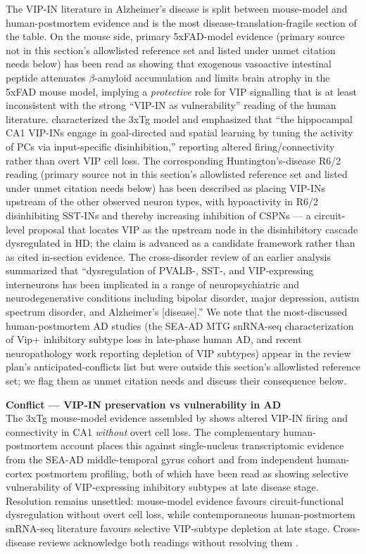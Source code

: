 \documentclass[11pt]{article}
\begin{document}
The VIP-IN literature in Alzheimer's disease is split between mouse-model
and human-postmortem evidence and is the most disease-translation-fragile
section of the table. On the mouse side, primary 5xFAD-model evidence (primary source not in this section's
allowlisted reference set and listed under unmet citation needs below) has been read as showing that exogenous vasoactive intestinal
peptide attenuates $\beta$-amyloid accumulation and limits brain atrophy in
the 5xFAD mouse model, implying a \textit{protective} role for VIP signalling
that is at least
inconsistent with the strong ``VIP-IN as vulnerability'' reading of the
human literature. \citet{Michaud2024} characterized the 3xTg model and
emphasized that ``the hippocampal CA1 VIP-INs engage in goal-directed and
spatial learning by tuning the activity of PCs via input-specific
disinhibition,'' reporting altered firing/connectivity rather than overt
VIP cell loss. The corresponding Huntington's-disease R6/2 reading
(primary source not in this section's allowlisted reference set and
listed under unmet citation needs below) has been described as placing
VIP-INs upstream of the other observed neuron types, with hypoactivity
in R6/2 disinhibiting SST-INs and thereby increasing inhibition of
CSPNs --- a circuit-level proposal that locates VIP as the upstream
node in the disinhibitory cascade dysregulated in HD; the claim is
advanced as a candidate framework rather than as cited in-section
evidence. The cross-disorder review of an earlier analysis summarized that
``dysregulation of PVALB-, SST-, and VIP-expressing interneurons has been
implicated in a range of neuropsychiatric and neurodegenerative
conditions including bipolar disorder, major depression, autism spectrum
disorder, and Alzheimer's [disease].'' We note that the most-discussed
human-postmortem AD studies (the SEA-AD MTG snRNA-seq characterization of
Vip+ inhibitory subtype loss in late-phase human AD, and recent
neuropathology work reporting depletion of VIP subtypes) appear in the
review plan's anticipated-conflicts list but were outside this section's allowlisted reference set; we flag them as
unmet citation needs and discuss their consequence below.

\begin{framed}
\textbf{Conflict --- VIP-IN preservation vs vulnerability in AD}\\
The 3xTg mouse-model evidence assembled by \citet{Michaud2024} shows
altered VIP-IN firing and connectivity in CA1 \textit{without} overt cell loss.
The complementary human-postmortem account places this against
single-nucleus transcriptomic evidence from the SEA-AD middle-temporal
gyrus cohort \citep{Gabitto2024} and from independent human-cortex
postmortem profiling, both of which have been read as
showing selective vulnerability of VIP-expressing inhibitory subtypes at
late disease stage. Resolution remains unsettled: mouse-model evidence
favours circuit-functional dysregulation without overt cell loss, while
contemporaneous human-postmortem snRNA-seq literature
\citep{Gabitto2024} favours selective VIP-subtype depletion at
late stage. Cross-disease reviews acknowledge both readings without
resolving them \citep{Gil2024}.
\end{framed}
\end{document}
